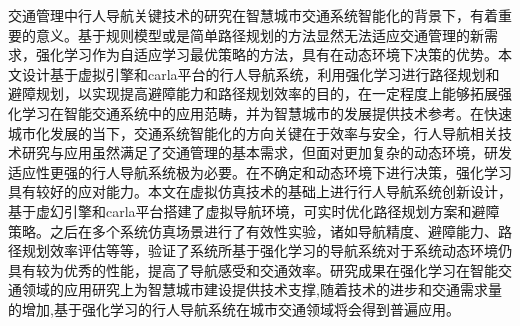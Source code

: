 \begin{abstractzh}

交通管理中行人导航关键技术的研究在智慧城市交通系统智能化的背景下，有着重要的意义。基于规则模型或是简单路径规划的方法显然无法适应交通管理的新需求，强化学习作为自适应学习最优策略的方法，具有在动态环境下决策的优势。本文设计基于虚拟引擎和carla平台的行人导航系统，利用强化学习进行路径规划和避障规划，以实现提高避障能力和路径规划效率的目的，在一定程度上能够拓展强化学习在智能交通系统中的应用范畴，并为智慧城市的发展提供技术参考。在快速城市化发展的当下，交通系统智能化的方向关键在于效率与安全，行人导航相关技术研究与应用虽然满足了交通管理的基本需求，但面对更加复杂的动态环境，研发适应性更强的行人导航系统极为必要。在不确定和动态环境下进行决策，强化学习具有较好的应对能力。本文在虚拟仿真技术的基础上进行行人导航系统创新设计，基于虚幻引擎和carla平台搭建了虚拟导航环境，可实时优化路径规划方案和避障策略。之后在多个系统仿真场景进行了有效性实验，诸如导航精度、避障能力、路径规划效率评估等等，验证了系统所基于强化学习的导航系统对于系统动态环境仍具有较为优秀的性能，提高了导航感受和交通效率。研究成果在强化学习在智能交通领域的应用研究上为智慧城市建设提供技术支撑,随着技术的进步和交通需求量的增加,基于强化学习的行人导航系统在城市交通领域将会得到普遍应用。

\end{abstractzh}
